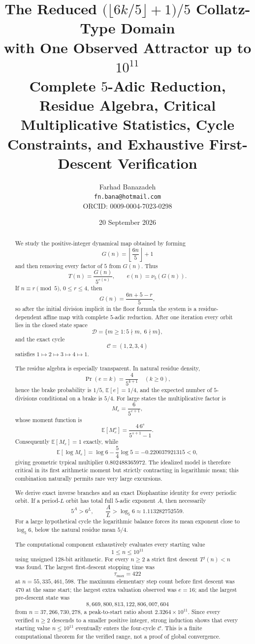 \documentclass[11pt]{article}
\title{\bfseries The Reduced $\bigl(\lfloor 6k/5\rfloor+1\bigr)/5$ Collatz-Type Domain\\[0.18em]
with One Observed Attractor up to $10^{11}$\\[0.35em]
\large Complete $5$-Adic Reduction, Residue Algebra, Critical Multiplicative Statistics, Cycle Constraints, and Exhaustive First-Descent Verification}
\author{Farhad Banazadeh\\
\texttt{fn.bana@hotmail.com}\\
ORCID: 0009-0004-7023-0298}
\date{20 September 2026}
\theoremstyle{definition}
\newcommand{\nuFive}{\nu_5}
\newcommand{\Cyc}{\mathcal{C}}
\newcommand{\D}{\mathcal{D}}
\begin{document}
\maketitle

\begin{abstract}
We study the positive-integer dynamical map obtained by forming
\[
G(n)=\left\lfloor\frac{6n}{5}\right\rfloor+1
\]
and then removing every factor of $5$ from $G(n)$. Thus
\[
T(n)=\frac{G(n)}{5^{e(n)}},\qquad e(n)=\nuFive(G(n)).
\]
If $n\equiv r\pmod 5$, $0\le r\le4$, then
\[
G(n)=\frac{6n+5-r}{5},
\]
so after the initial division implicit in the floor formula the system is a residue-dependent affine map with complete $5$-adic reduction. After one iteration every orbit lies in the closed state space
\[
\D=\{m\ge1:5\nmid m,\;6\nmid m\},
\]
and the exact cycle
\[
\Cyc=(1,2,3,4)
\]
satisfies $1\mapsto2\mapsto3\mapsto4\mapsto1$.

The residue algebra is especially transparent. In natural residue density,
\[
\Pr(e=k)=\frac{4}{5^{k+1}}\quad(k\ge0),
\]
hence the brake probability is $1/5$, $\mathbb E[e]=1/4$, and the expected number of $5$-divisions conditional on a brake is $5/4$. For large states the multiplicative factor is
\[
M_e=\frac{6}{5^{e+1}},
\]
whose moment function is
\[
\mathbb E[M_e^s]=\frac{4\,6^s}{5^{s+1}-1}.
\]
Consequently $\mathbb E[M_e]=1$ exactly, while
\[
\mathbb E[\log M_e]=\log6-\frac54\log5=-0.220037921315<0,
\]
giving geometric typical multiplier 0.802488365972. The idealized model is therefore critical in its first arithmetic moment but strictly contracting in logarithmic mean; this combination naturally permits rare very large excursions.

We derive exact inverse branches and an exact Diophantine identity for every periodic orbit. If a period-$L$ orbit has total full $5$-adic exponent $A$, then necessarily
\[
5^A>6^L,\qquad \frac{A}{L}>\log_5 6\approx 1.113282752559.
\]
For a large hypothetical cycle the logarithmic balance forces its mean exponent close to $\log_5 6$, below the natural residue mean $5/4$.

The computational component exhaustively evaluates every starting value
\[
1\le n\le10^{11}
\]
using unsigned 128-bit arithmetic. For every $n\ge2$ a strict first descent $T^j(n)<n$ was found. The largest first-descent stopping time was
\[
\tau_{\max}=422
\]
at $n=55{,}335{,}461{,}598$. The maximum elementary step count before first descent was $470$ at the same start; the largest extra valuation observed was $e=16$; and the largest pre-descent state was
\[
8{,}669{,}800{,}813{,}122{,}806{,}007{,}604
\]
from $n=37{,}266{,}730{,}278$, a peak-to-start ratio about $2.3264\times10^{11}$. Since every verified $n\ge2$ descends to a smaller positive integer, strong induction shows that every starting value $n\le10^{11}$ eventually enters the four-cycle $\Cyc$. This is a finite computational theorem for the verified range, not a proof of global convergence.
\end{abstract}
\end{document}
